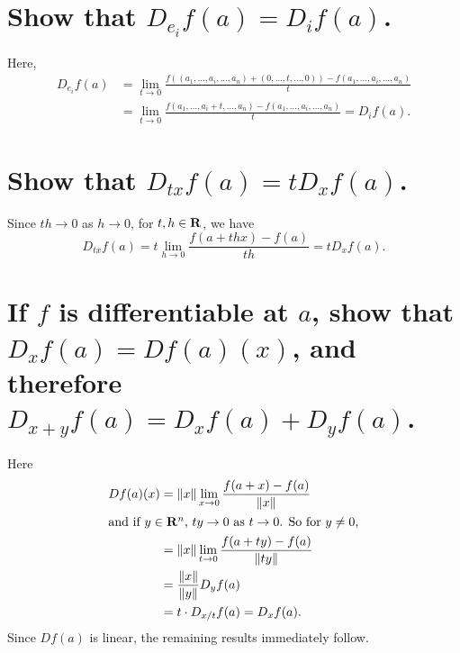 
\begin{parts}
    \part{
        Show that $D_{e_i}f(a)=D_if(a)$.
    }
    \begin{solution}
        Here,
        \begin{align*}
        D_{e_i}f(a)&=\lim_{t\to 0}{
        \frac{f((a_1,...,a_i,...,a_n)+
        (0,...,t,...,0))-
        f(a_1,...,a_i,...,a_n)}{t}
        }\\
        &=\lim_{t\to 0}{
        \frac{f(a_1,...,a_i+t,...,a_n)-
        f(a_1,...,a_i,...,a_n)}{t}
        }=D_if(a).
        \end{align*}
    \end{solution}
    \part{
        Show that $D_{tx}f(a)=tD_xf(a)$.
    }
    \begin{solution}
        Since $th\to 0$ as $h\to 0$,
        for $t,h\in \mathbf{R}$, we have
        $$D_{tx}f(a)=t\lim_{h\to 0}
        {\frac{f(a+thx)-f(a)}{th}}
        =tD_xf(a).$$
    \end{solution}

    \part{
        If $f$ is differentiable at $a$,
        show that $D_xf(a)=Df(a)(x)$, and
        therefore $D_{x+y}f(a)=D_xf(a)+
        D_yf(a)$.
    }
    \begin{solution}
        Here
        \begin{align*}
            Df(a)(x)
            &=\lVert x\rVert\lim_{x\to 0}
            {\dfrac{f(a+x)-f(a)}
            {\lVert x\rVert}}\\
            \shortintertext{and if
            $y\in\mathbf{R}^n$, $ty\to 0$ as
            $t\to 0$. So for $y\neq 0$,}
            &=\lVert x\rVert\lim_{t\to 0}
            {\dfrac{f(a+ty)-f(a)}{\lVert ty
            \rVert}}\\
            &=\dfrac{\lVert x\rVert}
            {\lVert y\rVert}D_yf(a)\\
            &=t\cdot D_{x/t}f(a)=D_xf(a).
        \end{align*}
        Since $Df(a)$ is linear, the
        remaining results immediately follow.
    \end{solution}
\end{parts}